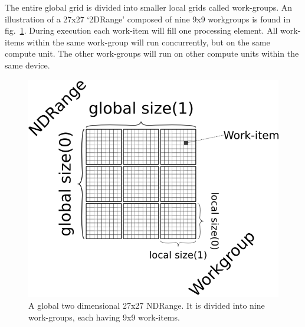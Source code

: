 The entire global grid is divided into smaller local grids called work-groups.
An illustration of a 27x27 `2DRange' composed of nine 9x9 workgroups is found in fig.~\ref{fig:OpenCL:ndrange}.
During execution each work-item will fill one processing element.
All work-items within the same work-group will run concurrently, but on the same compute unit. The other work-groups will run on other compute units within the same device.

\begin{figure}
\begin{center}
\includegraphics[scale=0.5]{../08-OpenCL/figs/NDRange.png}
\caption{A global two dimensional 27x27 NDRange. It is divided into nine work-groups, each having 9x9 work-items.}
\label{fig:OpenCL:ndrange}
\end{center}
\end{figure}



